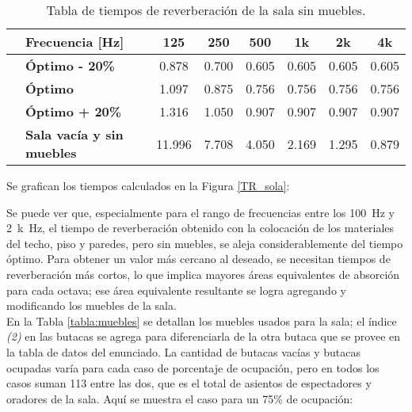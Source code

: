 		\begin{table}[H]
			\centering
			\begin{tabular}{@{}clcccccc@{}}
				& \textbf{Frecuencia [Hz]} & \textbf{125} & \textbf{250} & \textbf{500} & \textbf{1k} & \textbf{2k} & \textbf{4k}   \\ \toprule
				\multirow{6}{*}{\textbf{\rotatebox[origin=c]{90}{\parbox{2.2cm}{\;Tiempo de reverber [s]}}}} & \textbf{Óptimo - 20\%}		& 0.878 & 0.700 & 0.605 & 0.605 & 0.605 & 0.605 \\ \cmidrule{2-8}
					& \textbf{Óptimo}				& 1.097 & 0.875 & 0.756 & 0.756 & 0.756 & 0.756 \\ \cmidrule{2-8}
					& \textbf{Óptimo + 20\%}		& 1.316 & 1.050 & 0.907 & 0.907 & 0.907 & 0.907 \\ \cmidrule{2-8}
					& \textbf{Sala vacía y sin muebles}				& 11.996 & 7.708 & 4.050 & 2.169 & 1.295 & 0.879 \\\bottomrule
			\end{tabular}%
			\caption{Tabla de tiempos de reverberación de la sala sin muebles.}
			\label{tabla:tr_finales_sola}
		\end{table}
		
		Se grafican los tiempos calculados en la Figura \ref{TR_sola}:
		
		
		Se puede ver que, especialmente para el rango de frecuencias entre los \SI{100}{\Hz} y \SI{2}{k\Hz}, el tiempo de reverberación obtenido con la colocación de los materiales del techo, piso y paredes, pero sin muebles, se aleja considerablemente del tiempo óptimo. Para obtener un valor más cercano al deseado, se necesitan tiempos de reverberación más cortos, lo que implica mayores áreas equivalentes de absorción para cada octava; ese área equivalente resultante se logra agregando y modificando los muebles de la sala.\\
		
		
		En la Tabla \ref{tabla:muebles} se detallan los muebles usados para la sala; el índice \textit{(2)} en las butacas se agrega para diferenciarla de la otra butaca que se provee en la tabla de datos del enunciado. La cantidad de butacas vacías y butacas ocupadas varía para cada caso de porcentaje de ocupación, pero en todos los casos suman 113 entre las dos, que es el total de asientos de espectadores y oradores de la sala. Aquí se muestra el caso para un 75\% de ocupación:

